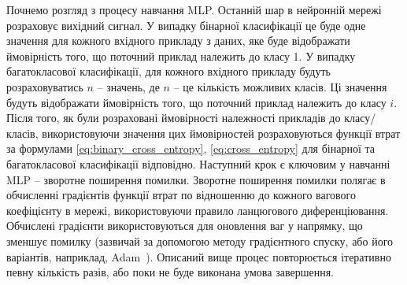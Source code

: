 Почнемо розгляд з  процесу навчання MLP. Останній шар в нейронній мережі розраховує вихідний сигнал. У випадку бінарної класифікації це буде одне значення для кожного вхідного прикладу з даних, яке буде відображати ймовірність того, що поточний приклад належить до класу 1. У випадку багатокласової класифікації, для кожного вхідного прикладу будуть розраховуватись $n$ -- значень, де $n$ -- це кількість можливих класів. Ці значення будуть відображати ймовірність того, що поточний приклад належить до класу $i$. Після того, як були розраховані ймовірності належності прикладів до класу/класів, використовуючи значення цих ймовірностей розраховуються функції втрат за формулами \ref{eq:binary_cross_entropy}, \ref{eq:cross_entropy} для бінарної та багатокласової класифікації відповідно. Наступний крок є ключовим у навчанні MLP -- зворотне поширення помилки. Зворотне поширення помилки полягає в обчисленні градієнтів функції втрат по відношенню до кожного вагового коефіцієнту в мережі, використовуючи правило ланцюгового диференціювання. Обчислені градієнти використовуються для оновлення ваг у напрямку, що зменшує помилку (зазвичай за допомогою методу градієнтного спуску, або його варіантів, наприклад, Adam~\cite{ct9}). Описаний вище процес повторюється ітеративно певну кількість разів, або поки не буде виконана умова завершення.

